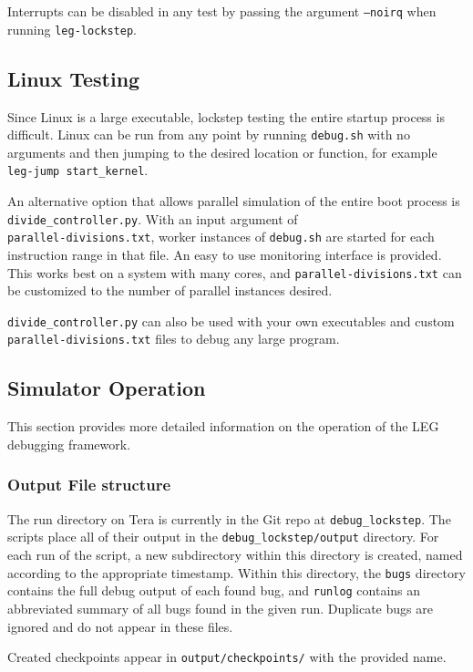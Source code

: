 Interrupts can be disabled in any test by passing the argument \texttt{--noirq} when running \texttt{leg-lockstep}.

\subsection{Linux Testing}
Since Linux is a large executable, lockstep testing the entire startup process is difficult. 
Linux can be run from any point by running \texttt{debug.sh} with no arguments and then jumping to the desired location or function, for example \texttt{leg-jump start\_kernel}.

An alternative option that allows parallel simulation of the entire boot process is \\\texttt{divide\_controller.py}. 
With an input argument of \\\texttt{parallel-divisions.txt}, worker instances of \texttt{debug.sh} are started for each instruction range in that file. 
An easy to use monitoring interface is provided.
This works best on a system with many cores, and \texttt{parallel-divisions.txt} can be customized to the number of parallel instances desired.

\texttt{divide\_controller.py} can also be used with your own executables and custom \\\texttt{parallel-divisions.txt} files to debug any large program.

\subsection{Simulator Operation}
This section provides more detailed information on the operation of the LEG debugging framework.

\subsubsection{Output File structure}
The run directory on Tera is currently in the Git repo at \texttt{debug\_lockstep}. The scripts place all of their output in the \texttt{debug\_lockstep/output} directory. For each run of the script, a new subdirectory within this directory is created, named according to the appropriate timestamp. Within this directory, the \texttt{bugs} directory contains the full debug output of each found bug, and \texttt{runlog} contains an abbreviated summary of all bugs found in the given run. Duplicate bugs are ignored and do not appear in these files.

Created checkpoints appear in \texttt{output/checkpoints/} with the provided name.


